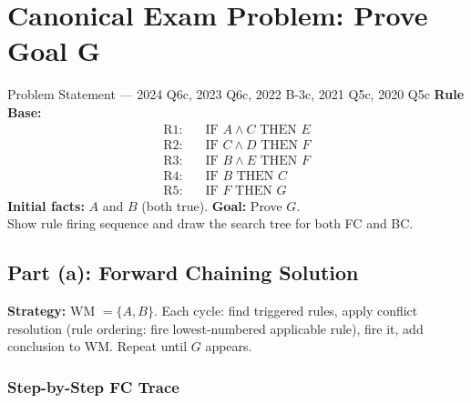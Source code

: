 \documentclass[12pt,a4paper]{article}
\begin{document}
\section{Canonical Exam Problem: Prove Goal G}

\begin{exambox}{Problem Statement --- 2024 Q6c, 2023 Q6c, 2022 B-3c, 2021 Q5c, 2020 Q5c}
\textbf{Rule Base:}
\begin{align*}
  \text{R1:} & \quad \text{IF } A \wedge C \text{ THEN } E \\
  \text{R2:} & \quad \text{IF } C \wedge D \text{ THEN } F \\
  \text{R3:} & \quad \text{IF } B \wedge E \text{ THEN } F \\
  \text{R4:} & \quad \text{IF } B \text{ THEN } C \\
  \text{R5:} & \quad \text{IF } F \text{ THEN } G
\end{align*}
\textbf{Initial facts:} $A$ and $B$ (both true). \quad \textbf{Goal:} Prove $G$.\\
Show rule firing sequence and draw the search tree for both FC and BC.
\end{exambox}

\subsection{Part (a): Forward Chaining Solution}

\textbf{Strategy:} WM $=\{A,B\}$. Each cycle: find triggered rules, apply conflict resolution
(rule ordering: fire lowest-numbered applicable rule), fire it, add conclusion to WM.
Repeat until $G$ appears.

\subsubsection{Step-by-Step FC Trace}
\end{document}
